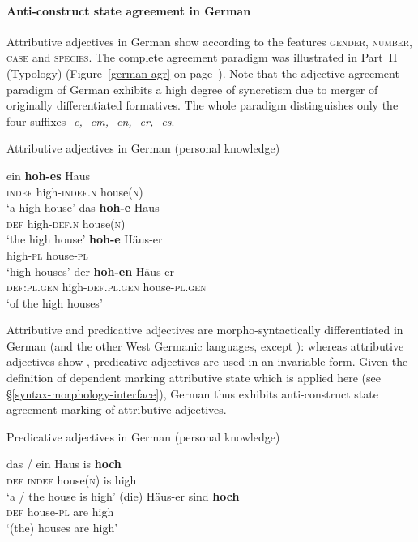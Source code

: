 \paragraph*{Anti\hyp{}construct state agreement in German}
Attributive adjectives in German show  according to the features \textsc{gender, number, case} and \textsc{species}. The complete agreement paradigm was illustrated in Part~II (Typology) (Figure~\ref{german agr} on page~\pageref{german agr}). Note that the adjective agreement paradigm of German exhibits a high degree of syncretism due to merger of originally differentiated formatives. The whole paradigm distinguishes only the four suffixes \textit{-e, -em, -en, -er, -es}.
\begin{exe}
\ex \rm{Attributive adjectives in German (personal knowledge)}
\begin{xlist}
\ex
\gll	ein \textbf{hoh-es} Haus\\
	\textsc{indef} high-\textsc{indef.n} house(\textsc{n})\\
\glt	‘a high house’
\ex	
\gll	das \textbf{hoh-e} Haus\\
	\textsc{def} high-\textsc{def.n} house(\textsc{n})\\
\glt	‘the high house’
\ex	
\gll	\textbf{hoh-e} Häus-er\\
	high-\textsc{pl} house-\textsc{pl}\\
\glt	‘high houses’
\ex	
\gll	der \textbf{hoh-en} Häus-er\\
	\textsc{def:pl.gen} high-\textsc{def.pl.gen} house-\textsc{pl.gen}\\
\glt	‘of the high houses’
\end{xlist}
\end{exe}
Attributive and predicative adjectives are morpho-syntactically differentiated in German (and the other West Germanic languages, except ): whereas attributive adjectives show , predicative adjectives are used in an invariable form. Given the definition of dependent marking attributive state which is applied here (see \S\ref{syntax-morphology-interface}), German thus exhibits anti\hyp{}construct state agreement marking of attributive adjectives.
\begin{exe}
\ex \rm{Predicative adjectives in German (personal knowledge)}
\begin{xlist}
\ex
\gll	das / ein Haus is \textbf{hoch}\\
	\textsc{def} {} \textsc{indef} house(\textsc{n}) is high\\
\glt	‘a / the house is high’
\ex	
\gll	(die) Häus-er sind \textbf{hoch}\\
	\textsc{def} house-\textsc{pl} are high\\
\glt	‘(the) houses are high’
\end{xlist}
\end{exe}

